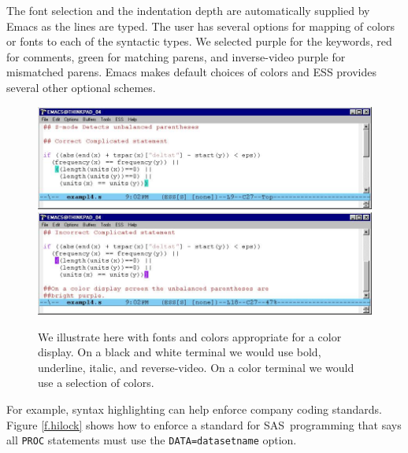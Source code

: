\documentclass{article}
\newif\ifdraft
\newcommand*{\SAS}{\textsc{SAS}}
\newcommand{\stexttt}[1]{{\small\texttt{#1}}}
\newcommand{\emptyfig}{
\hspace*{42pt}\rule{324pt}{.25pt}\\
\hspace*{42pt}\rule{.25pt}{10pc}
\rule{316pt}{.25pt}
\rule{.25pt}{10pc}}
\newenvironment{Comment}{\begin{quote}\small\itshape }{\end{quote}}
\begin{document}
The font selection and the indentation depth are automatically
supplied by Emacs as the lines are typed.  The user has several
options for mapping of colors or fonts to each of the syntactic types.
We selected
purple for the keywords, red for comments, green for matching parens,
and inverse-video purple for mismatched parens.  Emacs makes default
choices of colors and ESS provides several other optional schemes.

\begin{figure}[tbp]%
  \centering
\ifdraft
  \emptyfig
\else
  \includegraphics[angle=270,width=\textwidth]{font-cor-s}
  \includegraphics[angle=270,width=\textwidth]{font-incor-s}
\fi
  \caption{We illustrate here with fonts and colors appropriate for a
    color display.  On a black and white terminal we would use bold,
    underline, italic, and reverse-video.  On a color terminal we
    would use a selection of colors.}
  \label{f.font}
\end{figure}

For example, syntax highlighting can help enforce company coding
standards.  Figure \ref{f.hilock} shows how to enforce a standard for
\SAS\ programming that says all \stexttt{PROC} statements must use the
\stexttt{DATA=datasetname} option.

\end{document}
